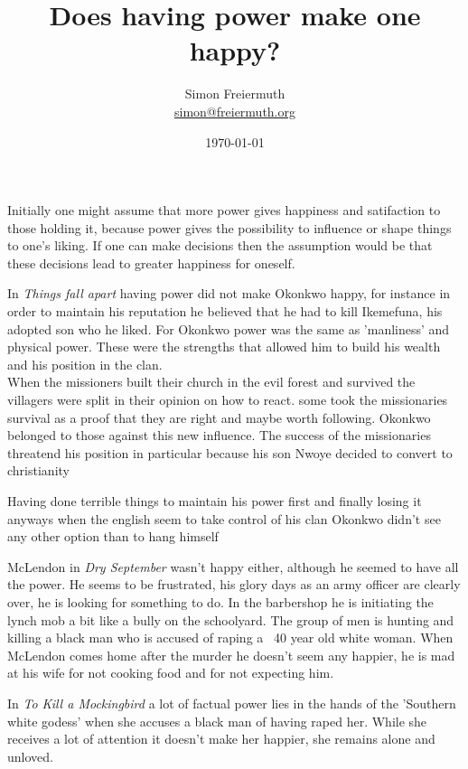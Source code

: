 \documentclass[12pt, letterpaper, twoside]{article}
\title{Does having power make one happy?}
\author{Simon Freiermuth \\ \href{mailto:simon@freiermuth.org}{simon@freiermuth.org}}
\date{\today}
\begin{document}
\maketitle

\begin{flushleft}

Initially one might assume that more power gives happiness and satifaction to those holding it,
because power gives the possibility to influence or shape things to one's liking.
If one can make decisions then the assumption would be that these decisions lead to greater happiness for oneself.

In \textit{Things fall apart} having power did not make Okonkwo happy, for instance in order to maintain his reputation
he believed that he had to kill Ikemefuna, his adopted son who he liked. For Okonkwo power was the same as 'manliness' and physical power.
These were the strengths that allowed him to build his wealth and his position in the clan.\\

When the missioners built their church in the evil forest and survived the villagers were split in their opinion on how to react.
some took the missionaries survival as a proof that they are right and maybe worth following.
Okonkwo belonged to those against this new influence. The success of the missionaries threatend his position
in particular because his son Nwoye decided to convert to christianity

Having done terrible things to maintain his power first and finally losing it anyways when the english seem to take control of his clan
Okonkwo didn't see any other option than to hang himself

\hfill

McLendon in \textit{Dry September} wasn't happy either, although he seemed to have all the power.
He seems to be frustrated, his glory days as an army officer are clearly over, he is looking for something to do.
In the barbershop he is initiating the lynch mob a bit like a bully on the schoolyard. The group of men is hunting and killing a black man
who is accused of raping a ~40 year old white woman.
When McLendon comes home after the murder he doesn't seem any happier, he is mad at his wife for not cooking food and for not expecting him.

\hfill

In \textit{To Kill a Mockingbird} a lot of factual power lies in the hands of the 'Southern white godess'
when she accuses a black man of having raped her. While she receives a lot of attention it doesn't make her happier,
she remains alone and unloved.



\end{flushleft}
\end{document}
